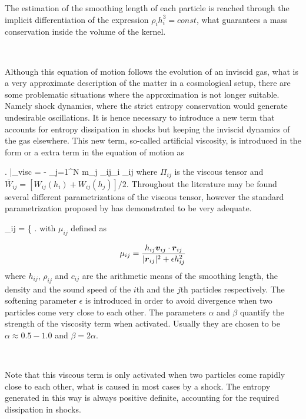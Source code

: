 \documentclass[a4,useAMS,usenatbib,usegraphicx,12pt]{article}
\begin{document}
The estimation of the smoothing length of each particle is reached through the
implicit differentiation of the expression $\rho_i h_i^3 = const$, what 
guarantees a mass conservation inside the volume of the kernel.

\

Although this equation of motion follows the evolution of an inviscid gas, what
is a very approximate description of the matter in a cosmological setup, there
are some problematic situations where the approximation is not longer suitable.
Namely shock dynamics, where the strict entropy conservation would generate
undesirable oscillations. It is hence necessary to introduce a new term that 
accounts for entropy dissipation in shocks but keeping the inviscid dynamics of
the gas elsewhere. This new term, so-called artificial viscosity, is introduced 
in the form or a extra term in the equation of motion as

{ \left. \right|_{\mbox{\footnotesize visc}} =
- \sum_{j=1}^N m_j \Pi_{ij}\nabla_i _{ij} }
where $\Pi_{ij}$ is the viscous tensor and $\overline{W}_{ij} = [W_{ij}(h_i)+
W_{ij}(h_j)]/2$. Throughout the literature may be found several different 
parametrizations of the viscous tensor, however the standard parametrization
proposed by \citet{Monaghan83} has demonstrated to be very adequate.

{ \Pi_{ij} = \left\{ \right. }
with $\mu_{ij}$ defined as

\[ \mu_{ij} = \frac{h_{ij}\boldsymbol{ v }_{ij}\cdot \boldsymbol{ r }_{ij}}{|\boldsymbol{ r }_{ij}|^2 + 
\epsilon h_{ij}^2} \]
where $h_{ij}$, $\rho_{ij}$ and $c_{ij}$ are the arithmetic means of the smoothing
length, the density and the sound speed of the $i$th and the $j$th particles 
respectively. The softening parameter $\epsilon$ is introduced in order to avoid
divergence when two particles come very close to each other. The parameters 
$\alpha$ and $\beta$ quantify the strength of the viscosity term when activated.
Usually they are chosen to be $\alpha \approx 0.5-1.0 $ and $\beta=2\alpha$.

\

Note that this viscous term is only activated when two particles come rapidly 
close to each other, what is caused in most cases by a shock. The entropy 
generated in this way is always positive definite, accounting for the required
dissipation in shocks.
\end{document}
